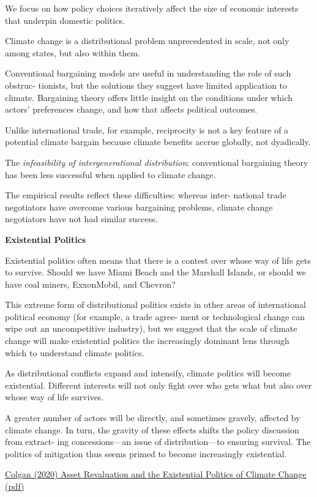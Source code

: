 \documentclass[
]{book}
\begin{document}
We focus on how policy choices iteratively affect
the size of economic interests that underpin domestic politics.

Climate change is a distributional problem unprecedented in scale,
not only among states, but also within them.

Conventional bargaining models are useful in understanding the role of such obstruc-
tionists, but the solutions they suggest have limited application to climate.
Bargaining theory offers little insight on the conditions
under which actors' preferences change, and how that affects political outcomes.

Unlike international trade, for example, reciprocity is not a key feature of a
potential climate bargain because climate benefits accrue globally, not dyadically.

The \emph{infeasibility of intergenerational distribution}:
conventional bargaining theory has been less successful when
applied to climate change.

The empirical results reflect these difficulties: whereas inter-
national trade negotiators have overcome various bargaining problems, climate change
negotiators have not had similar success.

\textbf{Existential Politics}

Existential
politics often means that there is a contest over whose way of life gets to survive.
Should we have Miami Beach and the Marshall Islands, or should we have coal
miners, ExxonMobil, and Chevron?

This extreme form of distributional politics
exists in other areas of international political economy (for example, a trade agree-
ment or technological change can wipe out an uncompetitive industry), but we
suggest that the scale of climate change will make existential politics the increasingly
dominant lens through which to understand climate politics.

As distributional conflicts expand and intensify, climate politics will become
existential.
Different interests will not only fight over who gets what but also over
whose way of life survives.

A greater
number of actors will be directly, and sometimes gravely, affected by climate
change. In turn, the gravity of these effects shifts the policy discussion from extract-
ing concessions---an issue of distribution---to ensuring survival. The politics of
mitigation thus seems primed to become increasingly existential.

\href{https://www.cambridge.org/core/journals/international-organization/article/asset-revaluation-and-the-existential-politics-of-climate-change/0963988860A37F6988E73738EA93E0A1\#}{Colgan (2020) Asset Revaluation and the Existential Politics of Climate Change}
\href{pdf/Colgan_2020_Asset_Climate_Politics.pdf}{(pdf)}
\end{document}

